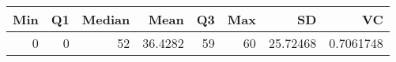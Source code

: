 
\begin{tabular}[t]{rrrrrrrr}
\toprule
Min & Q1 & Median & Mean & Q3 & Max & SD & VC\\
\midrule
0 & 0 & 52 & 36.4282 & 59 & 60 & 25.72468 & 0.7061748\\
\bottomrule
\end{tabular}